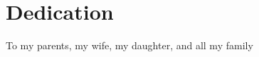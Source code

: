 \chapter*{\label{Dedication}Dedication}




\begin{center}
To my parents, my wife, my daughter, and all my family
\par\end{center}